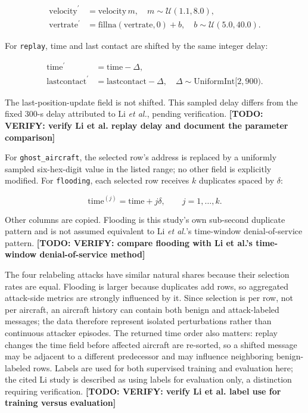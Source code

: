 \documentclass[conference]{IEEEtran}
\newcommand{\todo}[1]{\textbf{[TODO: #1]}}
\newcommand{\replay}{\texttt{replay}}
\newcommand{\ghost}{\texttt{ghost\_aircraft}}
\newcommand{\flood}{\texttt{flooding}}
\begin{document}
\begin{align}
\mathrm{velocity}^{\prime} &= \mathrm{velocity}\,m,\quad m\sim\mathcal{U}(1.1,8.0),\\
\mathrm{vertrate}^{\prime} &= \mathrm{fillna}(\mathrm{vertrate},0)+b,\quad b\sim\mathcal{U}(5.0,40.0).
\end{align}

For \replay, time and last contact are shifted by the same integer delay:

\begin{align}
\mathrm{time}^{\prime} &= \mathrm{time}-\Delta,\\
\mathrm{lastcontact}^{\prime} &= \mathrm{lastcontact}-\Delta,\quad \Delta\sim\mathrm{UniformInt}[2,900).
\end{align}

The last-position-update field is not shifted. This sampled delay differs from the fixed 300-s delay attributed to Li \emph{et al.}, pending verification. \todo{VERIFY: verify Li et al. replay delay and document the parameter comparison}



For \ghost, the selected row's address is replaced by a uniformly sampled six-hex-digit value in the listed range; no other field is explicitly modified. For \flood, each selected row receives $k$ duplicates spaced by $\delta$:

\begin{equation}
\mathrm{time}^{(j)}=\mathrm{time}+j\delta,\qquad j=1,\ldots,k.
\end{equation}

Other columns are copied. Flooding is this study's own sub-second duplicate pattern and is not assumed equivalent to Li \emph{et al.}'s time-window denial-of-service pattern. \todo{VERIFY: compare flooding with Li et al.'s time-window denial-of-service method}



The four relabeling attacks have similar natural shares because their selection rates are equal. Flooding is larger because duplicates add rows, so aggregated attack-side metrics are strongly influenced by it. Since selection is per row, not per aircraft, an aircraft history can contain both benign and attack-labeled messages; the data therefore represent isolated perturbations rather than continuous attacker episodes. The returned time order also matters: replay changes the time field before affected aircraft are re-sorted, so a shifted message may be adjacent to a different predecessor and may influence neighboring benign-labeled rows. Labels are used for both supervised training and evaluation here; the cited Li study is described as using labels for evaluation only, a distinction requiring verification. \todo{VERIFY: verify Li et al. label use for training versus evaluation}
\end{document}
